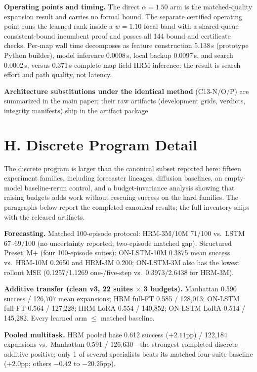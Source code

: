 \documentclass[letterpaper]{article} %
\newcommand{\stage}[1]{\textsc{#1}}
\begin{document}
\textbf{Operating points and timing.} The direct $\alpha{=}1.50$ arm is the matched-quality expansion result and carries no formal bound. The separate certified operating point runs the learned rank inside a $w{=}1.10$ focal band with a shared-queue consistent-bound incumbent proof and passes all 144 bound and certificate checks. Per-map wall time decomposes as feature construction 5.138\,s (prototype Python builder), model inference 0.0008\,s, local backup 0.0097\,s, and search 0.0002\,s, versus 0.371\,s complete-map field-HRM inference: the result is search effort and path quality, not latency.

\textbf{Architecture substitutions under the identical method} (\stage{C13-N/O/P}) are summarized in the main paper; their raw artifacts (development grids, verdicts, integrity manifests) ship in the artifact package.

\clearpage
\section{H. Discrete Program Detail}

The discrete program is larger than the canonical subset reported here: fifteen experiment families, including forecaster lineages, diffusion baselines, an empty-model baseline-rerun control, and a budget-invariance analysis showing that raising budgets adds work without rescuing success on the hard families. The paragraphs below report the completed canonical results; the full inventory ships with the released artifacts.

\textbf{Forecasting.} Matched 100-episode protocol: HRM-3M/10M 71/100 vs.\ LSTM 67--69/100 (no uncertainty reported; two-episode matched gap). Structured Preset~M+ (four 100-episode suites): ON-LSTM-10M 0.3875 mean success vs.\ HRM-10M 0.2650 and HRM-3M 0.200; ON-LSTM-3M also has the lowest rollout MSE (0.1257/1.1269 one-/five-step vs.\ 0.3973/2.6438 for HRM-3M).

\textbf{Additive transfer (clean v3, 22 suites $\times$ 3 budgets).} Manhattan 0.590 success / 126{,}707 mean expansions; HRM full-FT 0.585 / 128{,}013; ON-LSTM full-FT 0.564 / 127{,}228; HRM LoRA 0.554 / 140{,}852; ON-LSTM LoRA 0.514 / 145{,}282. Every learned arm $\leq$ matched baseline.

\textbf{Pooled multitask.} HRM pooled base 0.612 success ($+2.11$pp) / 122{,}184 expansions vs.\ Manhattan 0.591 / 126{,}630---the strongest completed discrete additive positive; only 1 of several specialists beats its matched four-suite baseline ($+2.0$pp; others $-0.42$ to $-20.25$pp).
\end{document}
